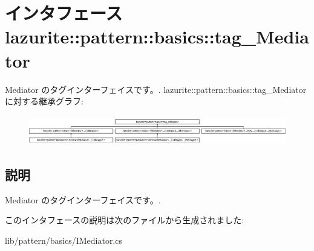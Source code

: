 \hypertarget{interfacelazurite_1_1pattern_1_1basics_1_1tag___mediator}{
\section{インタフェース lazurite::pattern::basics::tag\_\-Mediator}
\label{interfacelazurite_1_1pattern_1_1basics_1_1tag___mediator}
}


Mediator のタグインターフェイスです。.  
lazurite::pattern::basics::tag\_\-Mediatorに対する継承グラフ:\begin{figure}[H]
\begin{center}
\leavevmode
\includegraphics[height=1.2993cm]{interfacelazurite_1_1pattern_1_1basics_1_1tag___mediator}
\end{center}
\end{figure}


\subsection{説明}
Mediator のタグインターフェイスです。. 

このインタフェースの説明は次のファイルから生成されました:\begin{DoxyCompactItemize}
\item 
lib/pattern/basics/IMediator.cs\end{DoxyCompactItemize}
